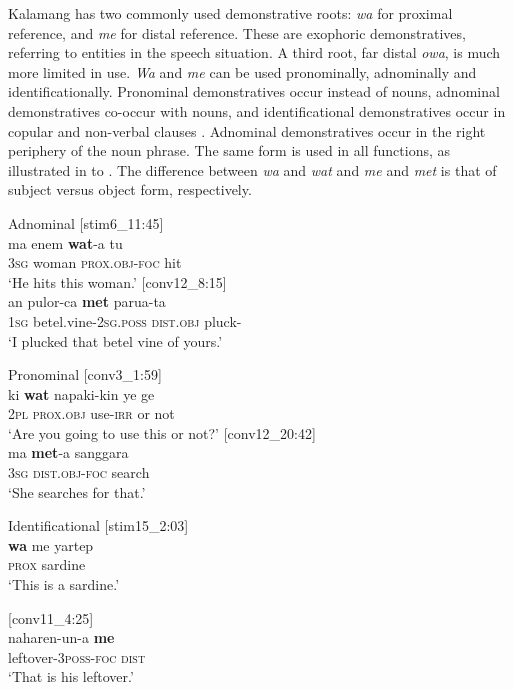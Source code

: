 \documentclass[output=paper,colorlinks,citecolor=brown]{langscibook}
\begin{document}
Kalamang has two commonly used demonstrative roots: \textit{wa} for proximal reference, and \textit{me} for distal reference. These are exophoric demonstratives, referring to entities in the speech situation. A third root, far distal \textit{owa}, is much more limited in use. \textit{Wa} and \textit{me} can be used pronominally, adnominally and identificationally. Pronominal demonstratives occur instead of nouns, adnominal demonstratives co-occur with nouns, and identificational demonstratives occur in copular and non-verbal clauses \citep[4]{Diessel1999Book}. Adnominal demonstratives occur in the right periphery of the noun phrase. The same form is used in all functions, as illustrated in  to . The difference between \textit{wa} and \textit{wat} and \textit{me} and \textit{met} is that of subject versus object form, respectively.


\ea Adnominal\label{exe:demadd}
\ea\label{exe:demad} [stim6\_11:45]\\
\gll ma enem \textbf{wat}-a tu\\
\textsc{3sg} woman \textsc{prox.obj-foc} hit\\	
\glt	`He hits this woman.' 
\ex  \label{exe:demadme} [conv12\_8:15]\\
\gll an pulor-ca \textbf{met} parua-ta\\
\textsc{1sg} betel.vine-\textsc{2sg.poss} \textsc{dist.obj} pluck-{\glta}\\	
\glt	`I plucked that betel vine of yours.' 
\z \z 

\ea Pronominal
\label{exe:demproo}
\ea \label{exe:dempro} [conv3\_1:59]\\
	\gll ki \textbf{wat} napaki-kin ye ge\\
	\textsc{2pl} \textsc{prox.obj} use-\textsc{irr} or not\\	
	\glt	`Are you going to use this or not?'
\ex \label{exe:demprome} [conv12\_20:42]\\
	\gll ma \textbf{met}-a sanggara\\
	\textsc{3sg} \textsc{dist.obj-foc} search\\	
	\glt	`She searches for that.'
\z\z 

\ea  Identificational\label{exe:demidd}
\ea \label{exe:demid} [stim15\_2:03]\\
\gll \textbf{wa} me yartep\\
\textsc{prox} {\glme} sardine\\	
\glt	`This is a sardine.' 

\ex \label{exe:demidme} [conv11\_4:25]\\
\gll naharen-un-a \textbf{me}\\
leftover-\textsc{3poss-foc} \textsc{dist}\\	
\glt	`That is his leftover.' 
\z\z
			
\end{document}
